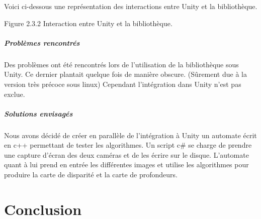 \documentclass[12pt,a4paper]{report}
\begin{document}
Voici ci-dessous une représentation des interactions entre Unity et la bibliothèque.
\begin{center}

Figure 2.3.2 Interaction entre Unity et la bibliothèque.

\end{center}
\paragraph{Problèmes rencontrés}
Des problèmes ont été rencontrés lors de l'utilisation de la bibliothèque sous Unity. Ce dernier plantait quelque fois de manière obscure. (Sûrement due à la version très précoce sous linux) Cependant l'intégration dans Unity n'est pas exclue.

\paragraph{Solutions envisagés}
Nous avons décidé de créer en parallèle de l'intégration à Unity un automate écrit en c++ permettant de tester les algorithmes. Un script c\# se charge de prendre une capture d'écran des deux caméras et de les écrire sur le disque. L'automate quant à lui prend en entrée les différentes images et utilise les algorithmes pour produire la carte de disparité et la carte de profondeurs.

\chapter{Conclusion}
\end{document}
